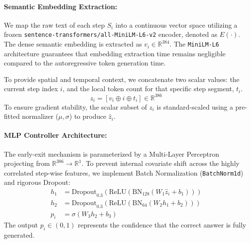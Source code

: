 \documentclass[11pt]{article}
\begin{document}
\paragraph{Semantic Embedding Extraction:} We map the raw text of each step $S_i$ into a continuous vector space utilizing a frozen \texttt{sentence-transformers/all-MiniLM-L6-v2} encoder, denoted as $E(\cdot)$. The dense semantic embedding is extracted as $v_i \in \mathbb{R}^{384}$. The \texttt{MiniLM-L6} architecture guarantees that embedding extraction time remains negligible compared to the autoregressive token generation time.

To provide spatial and temporal context, we concatenate two scalar values: the current step index $i$, and the local token count for that specific step segment, $t_i$. 
\begin{equation}
    z_i = [v_i \oplus i \oplus t_i] \in \mathbb{R}^{386}
\end{equation}
To ensure gradient stability, the scalar subset of $z_i$ is standard-scaled using a pre-fitted normalizer ($\mu, \sigma$) to produce $\hat{z}_i$.

\paragraph{MLP Controller Architecture:} The early-exit mechanism is parameterized by a Multi-Layer Perceptron projecting from $\mathbb{R}^{386} \rightarrow \mathbb{R}^1$. To prevent internal covariate shift across the highly correlated step-wise features, we implement Batch Normalization (\texttt{BatchNorm1d}) and rigorous Dropout:
\begin{align}
    h_1 &= \text{Dropout}_{0.3}(\text{ReLU}(\text{BN}_{128}(W_1 \hat{z}_i + b_1))) \\
    h_2 &= \text{Dropout}_{0.3}(\text{ReLU}(\text{BN}_{64}(W_2 h_1 + b_2))) \\
    p_i &= \sigma(W_3 h_2 + b_3)
\end{align}
The output $p_i \in (0,1)$ represents the confidence that the correct answer is fully generated. 
\end{document}
